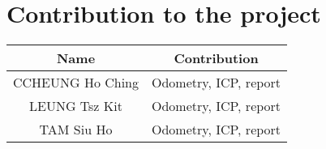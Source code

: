 \section{Contribution to the project}
\begin{table}[H]
    \centering
    \begin{tabular}{|c|c|}
        \hline
        \textbf{Name} & \textbf{Contribution} \\
        \hline
        CCHEUNG Ho Ching & Odometry, ICP, report \\
        \hline
        LEUNG Tsz Kit & Odometry, ICP, report \\
        \hline
        TAM Siu Ho & Odometry, ICP, report \\
        \hline
    \end{tabular}
\end{table}